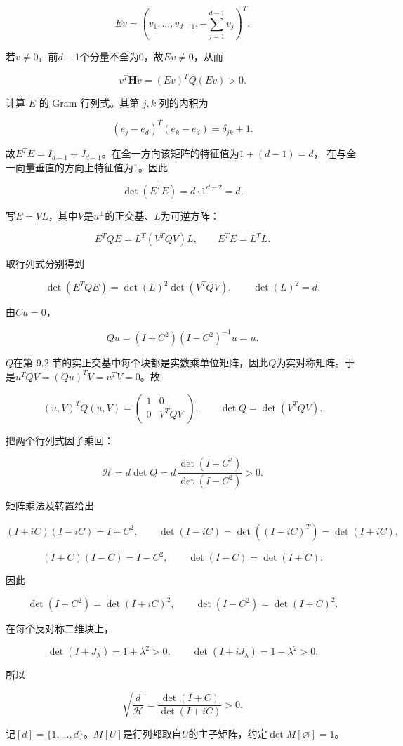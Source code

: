 \documentclass[11pt,a4paper]{article}
\begin{document}
\[
Ev=(v_1,\ldots,v_{d-1},-\textstyle\sum_{j=1}^{d-1}v_j)^T.
\]

若\(v\ne0\)，前\(d-1\)个分量不全为0，故\(Ev\ne0\)，从而

\[
v^T\mathbf Hv=(Ev)^TQ(Ev)>0.
\]

计算 \(E\) 的 Gram 行列式。其第 \(j,k\) 列的内积为

\[
(e_j-e_d)^T(e_k-e_d)=\delta_{jk}+1.
\]

故\(E^TE=I_{d-1}+J_{d-1}\)。在全一方向该矩阵的特征值为\(1+(d-1)=d\)， 在与全一向量垂直的方向上特征值为1。因此

\[
\det(E^TE)=d\cdot1^{d-2}=d.
\]

写\(E=VL\)，其中\(V\)是\(u^\perp\)的正交基、\(L\)为可逆方阵：

\[
E^TQE=L^T(V^TQV)L,\qquad
E^TE=L^TL.
\]

取行列式分别得到

\[
\det(E^TQE)=\det(L)^2\det(V^TQV),\qquad
\det(L)^2=d.
\]

由\(Cu=0\)，

\[
Qu=(I+C^2)(I-C^2)^{-1}u=u.
\]

\(Q\)在第 9.2 节的实正交基中每个块都是实数乘单位矩阵，因此\(Q\)为实对称矩阵。于是\(u^TQV=(Qu)^TV=u^TV=0\)。故

\[
(u,V)^TQ(u,V)=
\begin{pmatrix}1&0\\0&V^TQV\end{pmatrix},
\qquad \det Q=\det(V^TQV).
\]

把两个行列式因子乘回：

\[
\mathcal H=d\det Q
=d\,\frac{\det(I+C^2)}{\det(I-C^2)}>0.
\]

矩阵乘法及转置给出

\[
(I+iC)(I-iC)=I+C^2,\qquad
\det(I-iC)=\det((I-iC)^T)=\det(I+iC),
\]

\[
(I+C)(I-C)=I-C^2,\qquad \det(I-C)=\det(I+C).
\]

因此

\[
\det(I+C^2)=\det(I+iC)^2,\qquad
\det(I-C^2)=\det(I+C)^2.
\]

在每个反对称二维块上，

\[
\det(I+J_\lambda)=1+\lambda^2>0,\qquad
\det(I+iJ_\lambda)=1-\lambda^2>0.
\]

所以

\[
\sqrt{\frac d{\mathcal H}}
=\frac{\det(I+C)}{\det(I+iC)}>0.
\]

记\([d]=\{1,\ldots,d\}\)。\(M[U]\)是行列都取自\(U\)的主子矩阵，约定\(\det M[\varnothing]=1\)。
\end{document}
